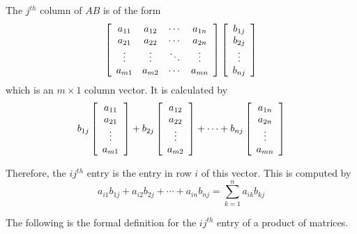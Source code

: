 The $j^{th}$ column of $AB$ is of the form
\begin{equation*}
\left[
\begin{array}{cccc}
a_{11} & a_{12} & \cdots & a_{1n} \\
a_{21} & a_{22} & \cdots & a_{2n} \\
\vdots & \vdots & \ddots & \vdots \\
a_{m1} & a_{m2} & \cdots & a_{mn}
\end{array}
\right] \left[
\begin{array}{c}
b_{1j} \\
b_{2j} \\
\vdots \\
b_{nj}
\end{array}
\right]
\end{equation*}
which is an $m\times 1$ column vector. It is calculated by 
\begin{equation*}
b_{1j}
\left[
\begin{array}{c}
a_{11} \\
a_{21} \\
\vdots \\
a_{m1}
\end{array}
\right] + b_{2j}\left[
\begin{array}{c}
a_{12} \\
a_{22} \\
\vdots \\
a_{m2}
\end{array}
\right] +\cdots + b_{nj}\left[
\begin{array}{c}
a_{1n} \\
a_{2n} \\
\vdots \\
a_{mn}
\end{array}
\right] 
\end{equation*}

Therefore, the $ij^{th}$ entry is the entry in row $i$ of this vector.
This is computed by 
\begin{equation*}
a_{i1}b_{1j}+a_{i2}b_{2j}+\cdots + a_{in}b_{nj}=\sum_{k=1}^{n}a_{ik}b_{kj}
\end{equation*}

The following is the formal definition for the $ij^{th}$ entry of a product of matrices. 

